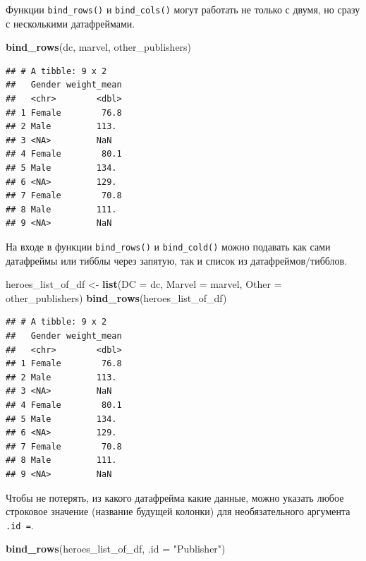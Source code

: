 \documentclass[]{book}
\newenvironment{Shaded}{\begin{snugshade}}{\end{snugshade}}
\newcommand{\KeywordTok}[1]{\textcolor[rgb]{0.13,0.29,0.53}{\textbf{#1}}}
\newcommand{\DataTypeTok}[1]{\textcolor[rgb]{0.13,0.29,0.53}{#1}}
\newcommand{\StringTok}[1]{\textcolor[rgb]{0.31,0.60,0.02}{#1}}
\newcommand{\NormalTok}[1]{#1}
\begin{document}
Функции \texttt{bind\_rows()} и \texttt{bind\_cols()} могут работать не
только с двумя, но сразу с несколькими датафреймами.

\begin{Shaded}
\begin{Highlighting}[]
\KeywordTok{bind_rows}\NormalTok{(dc, marvel, other_publishers)}
\end{Highlighting}
\end{Shaded}

\begin{verbatim}
## # A tibble: 9 x 2
##   Gender weight_mean
##   <chr>        <dbl>
## 1 Female        76.8
## 2 Male         113. 
## 3 <NA>         NaN  
## 4 Female        80.1
## 5 Male         134. 
## 6 <NA>         129. 
## 7 Female        70.8
## 8 Male         111. 
## 9 <NA>         NaN
\end{verbatim}

На входе в функции \texttt{bind\_rows()} и \texttt{bind\_cold()} можно
подавать как сами датафреймы или тибблы через запятую, так и список из
датафреймов/тибблов.

\begin{Shaded}
\begin{Highlighting}[]
\NormalTok{heroes_list_of_df <-}\StringTok{ }\KeywordTok{list}\NormalTok{(}\DataTypeTok{DC =}\NormalTok{ dc, }
                          \DataTypeTok{Marvel =}\NormalTok{ marvel, }
                          \DataTypeTok{Other =}\NormalTok{ other_publishers)}
\KeywordTok{bind_rows}\NormalTok{(heroes_list_of_df)}
\end{Highlighting}
\end{Shaded}

\begin{verbatim}
## # A tibble: 9 x 2
##   Gender weight_mean
##   <chr>        <dbl>
## 1 Female        76.8
## 2 Male         113. 
## 3 <NA>         NaN  
## 4 Female        80.1
## 5 Male         134. 
## 6 <NA>         129. 
## 7 Female        70.8
## 8 Male         111. 
## 9 <NA>         NaN
\end{verbatim}

Чтобы не потерять, из какого датафрейма какие данные, можно указать
любое строковое значение (название будущей колонки) для необязательного
аргумента \texttt{.id\ =}.

\begin{Shaded}
\begin{Highlighting}[]
\KeywordTok{bind_rows}\NormalTok{(heroes_list_of_df, }\DataTypeTok{.id =} \StringTok{"Publisher"}\NormalTok{)}
\end{Highlighting}
\end{Shaded}
\end{document}
